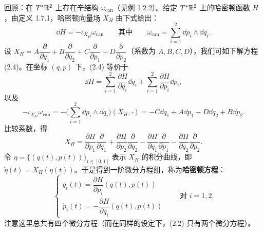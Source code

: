 回顾：在 $T^*\mathbb{R}^2$ 上存在辛结构 $\omega_{\mathrm{can}}$（见例 1.2.2）。给定 $T^*\mathbb{R}^2$ 上的哈密顿函数 $H$，由定义 1.7.1，哈密顿向量场 $X_H$ 由下式给出：
\begin{equation}
  \dd H=-\iota_{X_H}\omega_{\mathrm{can}}
  \qquad\text{其中}\qquad
  \omega_{\mathrm{can}}=\sum_{i=1}^2\dd p_i\wedge\dd q_i .
  \tag{2.4}
\end{equation}
设 $X_H=A\dfrac{\partial}{\partial q_1}+B\dfrac{\partial}{\partial q_2}+C\dfrac{\partial}{\partial p_1}+D\dfrac{\partial}{\partial p_2}$（系数为 $A,B,C,D$），我们可如下解方程 (2.4)。在坐标 $(q,p)$ 下，(2.4) 等价于
\[
  \dd H=\sum_{i=1}^2\frac{\partial H}{\partial q_i}\dd q_i
  +\sum_{i=1}^2\frac{\partial H}{\partial p_i}\dd p_i,
\]
以及
\[
  -\iota_{X_H}\omega_{\mathrm{can}}
  =-\Big(\sum_{i=1}^2\dd p_i\wedge\dd q_i\Big)(X_H,\cdot)
  =-C\dd q_1+A\dd p_1-D\dd q_2+B\dd p_2 .
\]
比较系数，得
\begin{equation}
  X_H=\frac{\partial H}{\partial p_1}\frac{\partial}{\partial q_1}
  +\frac{\partial H}{\partial p_2}\frac{\partial}{\partial q_2}
  -\frac{\partial H}{\partial q_1}\frac{\partial}{\partial p_1}
  -\frac{\partial H}{\partial q_2}\frac{\partial}{\partial p_2}.
  \tag{2.5}
\end{equation}
令 $\eta=\{(q(t),p(t))\}_{t\in[0,1]}$ 表示 $X_H$ 的积分曲线，即 $\dot\eta(t)=X_H(\eta(t))$。于是得到一阶微分方程组，称为\textbf{哈密顿方程}：
\begin{equation}
  \begin{cases}
    \dot q_i(t)=\dfrac{\partial H}{\partial p_i}(q(t),p(t))\\[2mm]
    \dot p_i(t)=-\dfrac{\partial H}{\partial q_i}(q(t),p(t))
  \end{cases}
  \qquad\text{对 } i=1,2 .
  \tag{2.6}
\end{equation}
注意这里总共有四个微分方程（而在同样的设定下，(2.2) 只有两个微分方程）。

